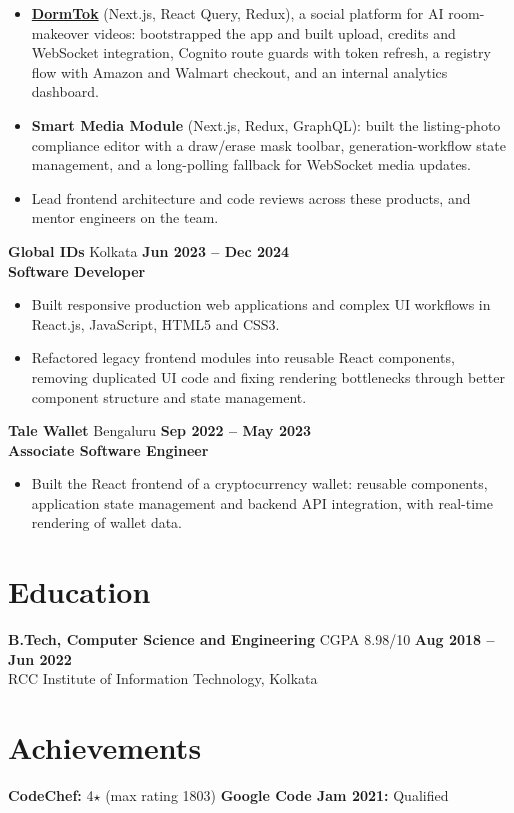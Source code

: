 \documentclass[10pt,letterpaper]{article}
\newcommand{\sep}{\enspace\textbar\enspace}
\begin{document}
\begin{itemize}
        pipeline (API client, Redux slice, WebSocket routing) and a dollhouse camera that fades walls blocking the view.
  \item \textbf{\href{https://dormtok.reimaginehome.ai}{DormTok}} (Next.js, React Query, Redux), a social platform for
        AI room-makeover videos: bootstrapped the app and built upload, credits and WebSocket integration, Cognito
        route guards with token refresh, a registry flow with Amazon and Walmart checkout, and an internal analytics
        dashboard.
  \item \textbf{Smart Media Module} (Next.js, Redux, GraphQL): built the listing-photo compliance editor with a
        draw/erase mask toolbar, generation-workflow state management, and a long-polling fallback for WebSocket
        media updates.
  \item Lead frontend architecture and code reviews across these products, and mentor engineers on the team.
\end{itemize}

\vspace{2pt}
\textbf{Global IDs} \sep Kolkata \hfill \textbf{Jun 2023 -- Dec 2024}\\
\textbf{Software Developer}
\begin{itemize}
  \item Built responsive production web applications and complex UI workflows in React.js, JavaScript, HTML5 and CSS3.
  \item Refactored legacy frontend modules into reusable React components, removing duplicated UI code and fixing
        rendering bottlenecks through better component structure and state management.
\end{itemize}

\vspace{2pt}
\textbf{Tale Wallet} \sep Bengaluru \hfill \textbf{Sep 2022 -- May 2023}\\
\textbf{Associate Software Engineer}
\begin{itemize}
  \item Built the React frontend of a cryptocurrency wallet: reusable components, application state management and
        backend API integration, with real-time rendering of wallet data.
\end{itemize}

\section{Education}
\textbf{B.Tech, Computer Science and Engineering} \sep CGPA 8.98/10 \hfill \textbf{Aug 2018 -- Jun 2022}\\
RCC Institute of Information Technology, Kolkata

\section{Achievements}
\textbf{CodeChef:} 4$\star$ (max rating 1803) \sep \textbf{Google Code Jam 2021:} Qualified
\end{document}
